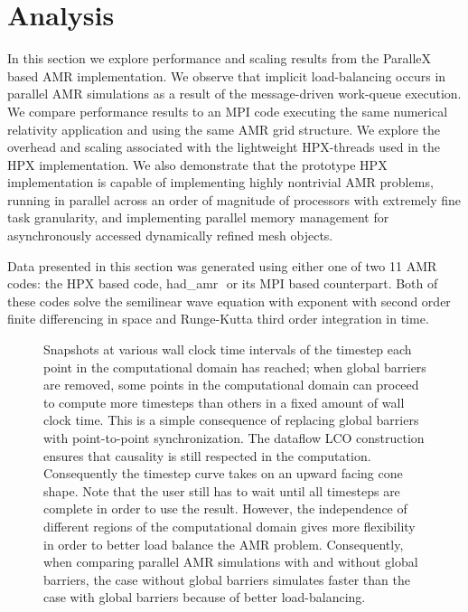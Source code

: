 \documentclass{revtex4}
\newcommand{\had}{{\sc had\_amr}}
\begin{document}
\section{Analysis}
\label{sec:analysis}

In this section we explore performance and scaling results from the ParalleX based AMR implementation.  
We observe that implicit load-balancing occurs in parallel AMR simulations as a result of the
message-driven work-queue execution.  We compare performance results to an
MPI code executing the same numerical relativity application and using the same AMR grid structure.
We explore the overhead and scaling associated with the lightweight HPX-threads used in the 
HPX implementation.  
We also demonstrate that the prototype HPX implementation
is capable of
implementing highly nontrivial AMR problems,
running in parallel across an order of magnitude of processors with 
extremely fine task granularity, 
and implementing parallel memory management for asynchronously accessed dynamically refined mesh objects. 

Data presented in this section was generated using either one of two
11 AMR codes: the HPX based code, \had\,\, or its MPI based counterpart.
Both of these codes solve the semilinear wave equation with 
exponent  with second order finite differencing in space and 
Runge-Kutta third order integration in time.  

\begin{figure}
 \caption{\small{Snapshots at various wall clock time intervals of the timestep each point in the computational domain has reached; when global barriers are removed, some points in the computational domain can proceed to compute more timesteps than others in a fixed amount of wall clock time.  This is a simple consequence of replacing global barriers with point-to-point synchronization.  
The dataflow LCO construction ensures that causality is still respected in the computation.  Consequently the timestep curve takes on an upward facing cone shape.    
Note that the user still has to wait until all timesteps are complete in order to use the result.  However, the independence of different regions of the computational domain gives more flexibility in order to better load balance the AMR problem. Consequently, when comparing parallel AMR simulations with and without global barriers, the case without global barriers simulates faster than the case with global barriers because of better load-balancing.
}} \label{fig:noglobalbarrier}
\end{figure}
\end{document}
